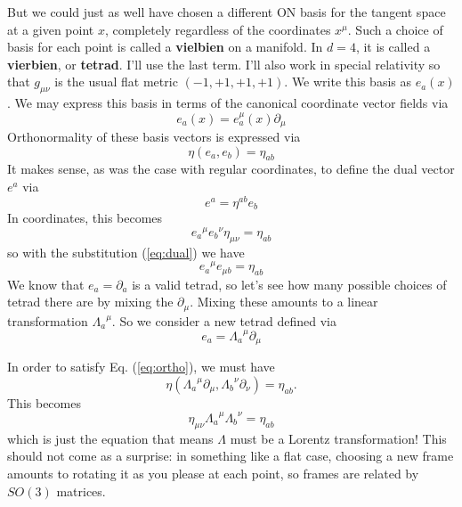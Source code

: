 \documentclass[main.tex]{subfiles}
\begin{document}
But we could just as well have chosen a different ON basis for the tangent space at a given point $x$, completely regardless of the coordinates $x^\mu$. Such a choice of basis for each point is called a \textbf{vielbien} on a manifold. In $d = 4$, it is called a \textbf{vierbien}, or \textbf{tetrad}. I'll use the last term. I'll also work in special relativity so that $g_{\mu \nu}$ is the usual flat metric $(-1,+1,+1,+1)$. We write this basis as $e_a(x)$. We may express this basis in terms of the canonical coordinate vector fields via
\begin{equation} \label{eq:tetrad}
e_a (x) = e_a^{\mu} (x) \partial_\mu
\end{equation}
Orthonormality of these basis vectors is expressed via
\begin{equation} \label{eq:ortho}
\eta(e_a,e_b) = \eta_{ab}
\end{equation}
It makes sense, as was the case with regular coordinates, to define the dual vector $e^a$ via
\begin{equation} \label{eq:dual}
e^a = \eta^{ab} e_b
\end{equation}
In coordinates, this becomes
\[
{e_a}^\mu {e_b}^\nu \eta_{\mu \nu} = \eta_{ab}
\]
so with the substitution (\ref{eq:dual}) we have
\begin{equation}
{e_a}^\mu e_{\mu b}  = \eta_{ab}
\end{equation}
We know that $e_a = \partial_a$ is a valid tetrad, so let's see how many possible choices of tetrad there are by mixing the $\partial_\mu$. Mixing these amounts to a linear transformation ${\Lambda_a}^\mu$. So we consider a new tetrad defined via
\[
e_a = {\Lambda_a}^\mu \partial_\mu
\]

In order to satisfy Eq. (\ref{eq:ortho}), we must have
\[
\eta ({\Lambda_a}^\mu \partial_\mu, {\Lambda_b}^\nu \partial_\nu) = \eta_{ab}.
\]
This becomes
\[
\eta_{\mu \nu} {\Lambda_a}^\mu {\Lambda_b}^\nu = \eta_{ab}
\]
which is just the equation that means $\Lambda$ must be a Lorentz transformation! This should not come as a surprise: in something like a flat case, choosing a new frame amounts to rotating it as you please at each point, so frames are related by $SO(3)$ matrices.
\end{document}
